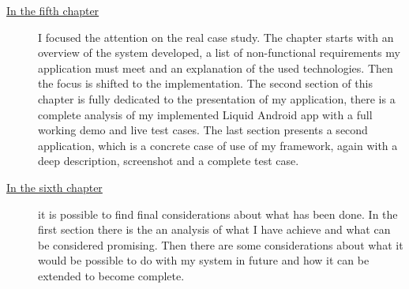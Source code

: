 \begin{description}
\item[{\hyperref[cap:proofofconcept]{In the fifth chapter}}] I focused the attention on the real case study. The chapter starts with an overview of the system developed, a list of non-functional requirements my application must meet and an explanation of the used technologies. Then the focus is shifted to the implementation. The second section of this chapter is fully dedicated to the presentation of my application, there is a complete analysis of my implemented Liquid Android app with a full working demo and live test cases. The last section presents a second application, which is a concrete case of use of my framework, again with a deep description, screenshot and a complete test case.

\item[{\hyperref[cap:conclusions]{In the sixth chapter}}]it is possible to find final considerations about what has been done. In the first section there is the an analysis of what I have achieve and what can be considered promising. Then there are some considerations about what it would be possible to do with my system in future and how it can be extended to become complete.
%
\end{description}
%

